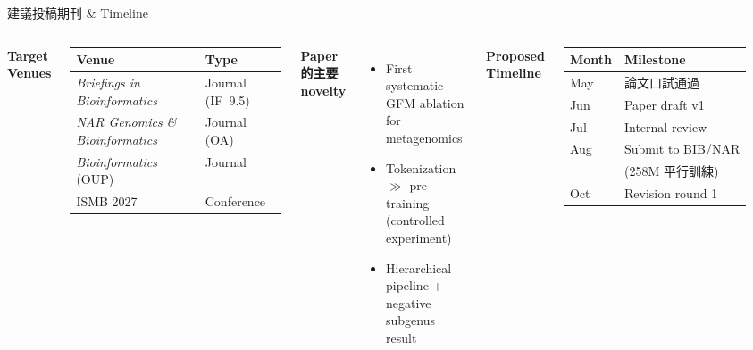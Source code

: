 \documentclass[aspectratio=169,12pt]{beamer}
\begin{document}
\begin{frame}{建議投稿期刊 \& Timeline}
\begin{columns}
\textbf{Target Venues}\\[6pt]
\begin{tabular}{ll}
\toprule
Venue & Type \\ \midrule
\textit{Briefings in Bioinformatics} & Journal (IF~9.5) \\
\textit{NAR Genomics \& Bioinformatics} & Journal (OA) \\
\textit{Bioinformatics} (OUP) & Journal \\
ISMB 2027 & Conference \\
\bottomrule
\end{tabular}

\vspace{8pt}
\textbf{Paper的主要 novelty}
\begin{itemize}\small
  \item First systematic GFM ablation for metagenomics
  \item Tokenization $\gg$ pre-training (controlled experiment)
  \item Hierarchical pipeline + negative subgenus result
\end{itemize}

\textbf{Proposed Timeline}\\[6pt]
\begin{tabular}{ll}
\toprule
Month & Milestone \\ \midrule
May   & 論文口試通過 \\
Jun   & Paper draft v1 \\
Jul   & Internal review \\
Aug   & Submit to BIB/NAR \\
      & (258M 平行訓練) \\
Oct   & Revision round 1 \\
\bottomrule
\end{tabular}
\end{columns}
\end{frame}
\end{document}
